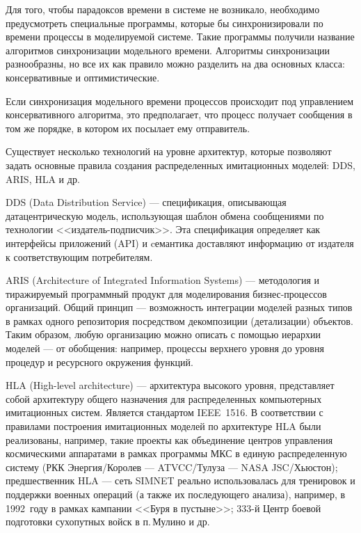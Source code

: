 Для того, чтобы парадоксов времени в системе не возникало, необходимо предусмотреть специальные программы, которые бы синхронизировали по времени процессы в моделируемой системе. Такие программы получили название алгоритмов синхронизации модельного времени. Алгоритмы синхронизации разнообразны, но все их как правило можно разделить на два основных класса: консервативные и оптимистические.

Если синхронизация модельного времени процессов происходит под управлением консервативного алгоритма, это предполагает, что процесс получает сообщения в том же порядке, в котором их посылает ему отправитель.


Существует несколько технологий на уровне архитектур, которые позволяют задать основные правила создания распределенных имитационных моделей: DDS, ARIS, HLA и др.


DDS (Data Distribution Service)  --- спецификация, описывающая датацентрическую модель, использующая шаблон обмена сообщениями по технологии <<издатель-подписчик>>. Эта спецификация определяет как интерфейсы приложений (API) и cемантика доставляют информацию от издателя к соответствующим потребителям.

ARIS (Architecture of Integrated Information Systems)  ---  методология и тиражируемый программный продукт для моделирования бизнес-процессов организаций. Общий принцип --- возможность интеграции моделей разных типов в рамках одного репозитория посредством декомпозиции (детализации) объектов. Таким образом, любую организацию можно описать с помощью иерархии моделей --- от обобщения: например, процессы верхнего уровня до уровня процедур и ресурсного окружения функций.

HLA (High-level architecture) --- архитектура высокого уровня, представляет собой архитектуру общего назначения для распределенных компьютерных имитационных систем. Является стандартом IEEE~1516.
В соответствии с правилами построения имитационных моделей по архитектуре HLA были реализованы, например, такие проекты как объединение центров управления космическими аппаратами в рамках программы МКС в единую распределенную систему (РКК Энергия/Королев --- ATVCC/Тулуза --- NASA JSC/Хьюстон); предшественник HLA --- сеть SIMNET реально использовалась для тренировок и поддержки военных операций (а также их последующего анализа), например, в 1992~году в рамках кампании <<Буря в пустыне>>; 333-й Центр боевой подготовки сухопутных войск в п.\,Мулино и др.

